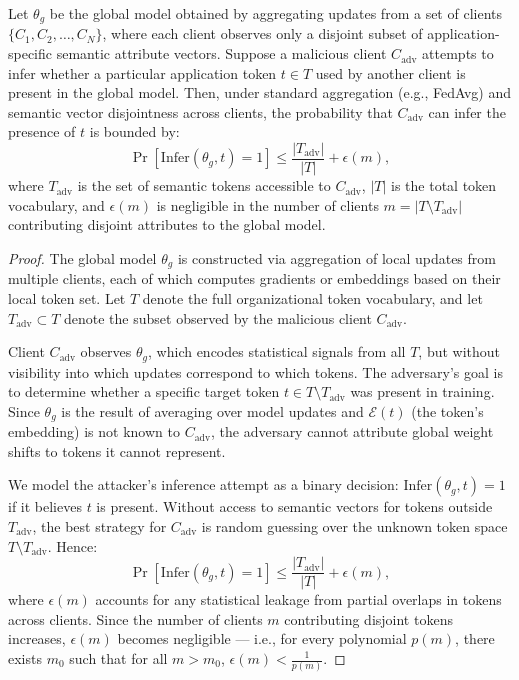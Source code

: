 \begin{theorem}
    Let \(\theta_g\) be the global model obtained by aggregating updates from a set of clients \(\{C_1, C_2, \ldots, C_N\}\), where each client observes only a disjoint subset of application-specific semantic attribute vectors. Suppose a malicious client \(C_{\text{adv}}\) attempts to infer whether a particular application token \(t \in T\) used by another client is present in the global model. Then, under standard aggregation (e.g., FedAvg) and semantic vector disjointness across clients, the probability that \(C_{\text{adv}}\) can infer the presence of \(t\) is bounded by:
\[
\Pr[\text{Infer}(\theta_g, t) = 1] \leq \frac{|T_{\text{adv}}|}{|T|} + \epsilon(m),
\]
where \(T_{\text{adv}}\) is the set of semantic tokens accessible to \(C_{\text{adv}}\), \(|T|\) is the total token vocabulary, and \(\epsilon(m)\) is negligible in the number of clients \(m = |T \setminus T_{\text{adv}}|\) contributing disjoint attributes to the global model.
\end{theorem}

\begin{proof}
The global model \(\theta_g\) is constructed via aggregation of local updates from multiple clients, each of which computes gradients or embeddings based on their local token set. Let \(T\) denote the full organizational token vocabulary, and let \(T_{\text{adv}} \subset T\) denote the subset observed by the malicious client \(C_{\text{adv}}\).

Client \(C_{\text{adv}}\) observes \(\theta_g\), which encodes statistical signals from all \(T\), but without visibility into which updates correspond to which tokens. The adversary’s goal is to determine whether a specific target token \(t \in T \setminus T_{\text{adv}}\) was present in training. Since \(\theta_g\) is the result of averaging over model updates and \(\mathcal{E}(t)\) (the token's embedding) is not known to \(C_{\text{adv}}\), the adversary cannot attribute global weight shifts to tokens it cannot represent.

We model the attacker’s inference attempt as a binary decision: \(\text{Infer}(\theta_g, t) = 1\) if it believes \(t\) is present. Without access to semantic vectors for tokens outside \(T_{\text{adv}}\), the best strategy for \(C_{\text{adv}}\) is random guessing over the unknown token space \(T \setminus T_{\text{adv}}\). Hence:
\[
\Pr[\text{Infer}(\theta_g, t) = 1] \leq \frac{|T_{\text{adv}}|}{|T|} + \epsilon(m),
\]
where \(\epsilon(m)\) accounts for any statistical leakage from partial overlaps in tokens across clients. Since the number of clients \(m\) contributing disjoint tokens increases, \(\epsilon(m)\) becomes negligible — i.e., for every polynomial \(p(m)\), there exists \(m_0\) such that for all \(m > m_0\), \(\epsilon(m) < \frac{1}{p(m)}\).
\end{proof}

